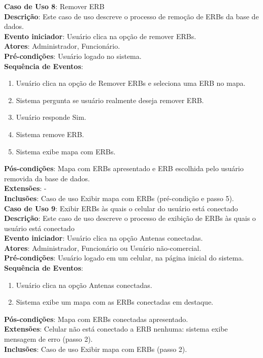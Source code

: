 \documentclass[]{politex}
\begin{document}
\noindent \textbf{Caso de Uso 8}: Remover ERB \\
\textbf{Descrição}: Este caso de uso descreve o processo de remoção de ERBs da
base de dados. \\
\textbf{Evento iniciador}: Usuário clica na opção de remover ERBs. \\
\textbf{Atores}: Administrador, Funcionário. \\
\textbf{Pré-condições}: Usuário logado no sistema. \\
\textbf{Sequência de Eventos}:
\begin{enumerate}
\item Usuário clica na opção de Remover ERBs e seleciona uma ERB no mapa.
\item Sistema pergunta se usuário realmente deseja remover ERB.
\item Usuário responde Sim.
\item Sistema remove ERB.
\item Sistema exibe mapa com ERBs.
\end{enumerate}
\textbf{Pós-condições}: Mapa com ERBs apresentado e ERB escolhida pelo usuário
removida da base de dados. \\
\textbf{Extensões}: - \\
\textbf{Inclusões}: Caso de uso Exibir mapa com ERBs (pré-condição e passo 5). \\

\noindent \textbf{Caso de Uso 9}: Exibir ERBs às quais o celular do usuário está
conectado \\
\textbf{Descrição}: Este caso de uso descreve o processo de exibição de ERBs às
quais o usuário está conectado \\
\textbf{Evento iniciador}: Usuário clica na opção Antenas conectadas. \\
\textbf{Atores}: Administrador, Funcionário ou Usuário não-comercial. \\
\textbf{Pré-condições}: Usuário logado em um celular, na página inicial do
sistema. \\
\textbf{Sequência de Eventos}:
\begin{enumerate}
\item Usuário clica na opção Antenas conectadas.
\item Sistema exibe um mapa com as ERBs conectadas em destaque.
\end{enumerate}
\textbf{Pós-condições}: Mapa com ERBs conectadas apresentado. \\
\textbf{Extensões}: Celular não está conectado a ERB nenhuma: sistema exibe
mensagem de erro (passo 2). \\
\textbf{Inclusões}: Caso de uso Exibir mapa com ERBs (passo 2). \\
\end{document}
